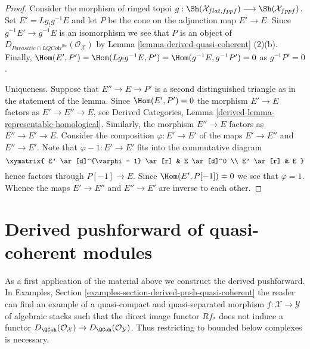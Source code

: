 \begin{proof}
Consider the morphism of ringed topoi
$g : \Sh(\mathcal{X}_{flat, fppf}) \longrightarrow \Sh(\mathcal{X}_{fppf})$.
Set $E' = Lg_!g^{-1}E$ and let $P$ be the cone on the adjunction
map $E' \to E$. Since $g^{-1}E' \to g^{-1}E$ is an isomorphism we see that
$P$ is an object of
$D_{\textit{Parasitic} \cap \textit{LQCoh}^{fbc}}(\mathcal{O}_\mathcal{X})$ by
Lemma \ref{lemma-derived-quasi-coherent} (2)(b).
Finally, $\Hom(E', P') = \Hom(Lg_!g^{-1}E, P') = \Hom(g^{-1}E, g^{-1}P') = 0$
as $g^{-1}P' = 0$.

\medskip\noindent
Uniqueness. Suppose that $E'' \to E \to P'$ is a second distinguished
triangle as in the statement of the lemma. Since $\Hom(E', P') = 0$
the morphism $E' \to E$ factors as $E' \to E'' \to E$, see
Derived Categories, Lemma \ref{derived-lemma-representable-homological}.
Similarly, the morphism $E'' \to E$ factors as $E'' \to E' \to E$.
Consider the composition $\varphi : E' \to E'$ of the maps $E' \to E''$ and
$E'' \to E'$. Note that $\varphi - 1 : E' \to E'$ fits into the commutative
diagram
$$
\xymatrix{
E' \ar[d]^{\varphi - 1} \ar[r] & E \ar[d]^0 \\
E' \ar[r] & E
}
$$
hence factors through $P[-1] \to E$. Since $\Hom(E', P[-1]) = 0$
we see that $\varphi = 1$. Whence the maps $E' \to E''$ and $E'' \to E'$
are inverse to each other.
\end{proof}






\section{Derived pushforward of quasi-coherent modules}
\label{section-derived-pushforward}

\noindent
As a first application of the material above we construct the derived
pushforward. In
Examples, Section \ref{examples-section-derived-push-quasi-coherent}
the reader can find an example of a quasi-compact and quasi-separated
morphism $f : \mathcal{X} \to \mathcal{Y}$ of algebraic stacks such
that the direct image functor $Rf_*$ does not induce a functor
$D_\QCoh(\mathcal{O}_\mathcal{X}) \to
D_\QCoh(\mathcal{O}_\mathcal{Y})$. Thus restricting to bounded
below complexes is necessary.

